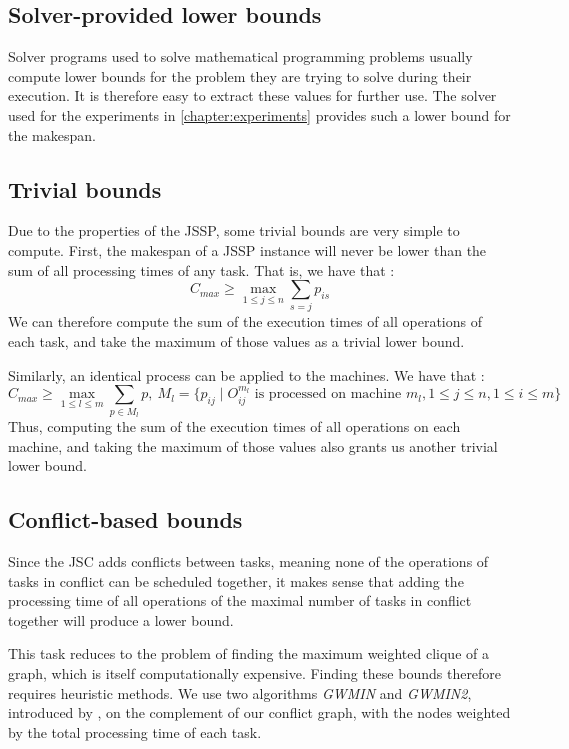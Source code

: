 \documentclass{mimosis}
\begin{document}
\subsection{Solver-provided lower bounds}
Solver programs used to solve mathematical programming problems usually compute lower bounds for the problem they are trying to solve during their execution. It is therefore easy to extract these values for further use. The solver used for the experiments in  \cref{chapter:experiments} provides such a lower bound for the makespan.

\subsection{Trivial bounds}
Due to the properties of the JSSP, some trivial bounds are very simple to compute. First, the makespan of a JSSP instance will never be lower than the sum of all processing times of any task. That is, we have that :
\begin{equation} \label{task_lower_bound_equ}
C_{max} \geq \max_{1 \leq j \leq n} \sum_{s = j} p_{is}
\end{equation}
We can therefore compute the sum of the execution times of all operations of each task, and take the maximum of those values as a trivial lower bound.

Similarly, an identical process can be applied to the machines. We have that :
\begin{equation} \label{machine_lower_bound_equ}
C_{max} \geq \max_{1 \leq l \leq m} \sum_{p \in M_l} p,\ M_l = \{p_{ij} \mid O_{ij}^{m_l} \text{ is processed on machine }m_l, 1 \leq j \leq n, 1 \leq i \leq m\}
\end{equation}
Thus, computing the sum of the execution times of all operations on each machine, and taking the maximum of those values also grants us another trivial lower bound.

\subsection{Conflict-based bounds}
Since the JSC adds conflicts between tasks, meaning none of the operations of tasks in conflict can be scheduled together, it makes sense that adding the processing time of all operations of the maximal number of tasks in conflict together will produce a lower bound. 

This task reduces to the problem of finding the maximum weighted clique of a graph, which is itself computationally expensive. Finding these bounds therefore requires heuristic methods. We use two algorithms \emph{GWMIN} and \emph{GWMIN2}, introduced by \citet{sakai2003note}, on the complement of our conflict graph, with the nodes weighted by the total processing time of each task. 
\end{document}
